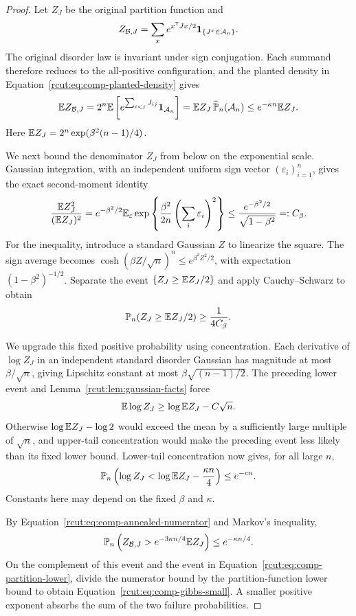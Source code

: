 \begin{proof}
 Let $Z_J$ be the original partition function and
 \[
  Z_{\mathcal B,J}=\sum_x e^{x^{\mathsf T}Jx/2}\mathbf 1_{\{J^x\in\mathcal A_n\}}.
 \]
 The original disorder law is invariant under sign conjugation.  Each
 summand therefore reduces to the all-positive configuration, and the
 planted density in Equation~\eqref{rcut:eq:comp-planted-density} gives
 \begin{equation}
  \mathbb E Z_{\mathcal B,J}
    =2^n\mathbb E\left[e^{\sum_{i<j}J_{ij}}\mathbf 1_{\mathcal A_n}\right]
    =\mathbb E Z_J\,\widehat{\mathbb P}_n(\mathcal A_n)
    \le e^{-\kappa n}\mathbb E Z_J.
  \label{rcut:eq:comp-annealed-numerator}
 \end{equation}
 Here $\mathbb E Z_J=2^n\exp(\beta^2(n-1)/4)$.

 We next bound the denominator $Z_J$ from below on the exponential
 scale.  Gaussian integration, with an independent uniform sign vector
 $(\varepsilon_i)_{i=1}^n$, gives the exact second-moment identity
 \begin{equation}
  \frac{\mathbb E Z_J^2}{(\mathbb E Z_J)^2}
    =e^{-\beta^2/2}\mathbb E_{\varepsilon}
       \exp\left\{\frac{\beta^2}{2n}
                    \left(\sum_i\varepsilon_i\right)^2\right\}
    \le\frac{e^{-\beta^2/2}}{\sqrt{1-\beta^2}}=:C_\beta.
  \label{rcut:eq:comp-partition-second-moment}
 \end{equation}
 For the inequality, introduce a standard Gaussian $Z$ to linearize
 the square.  The sign average becomes
 $\cosh(\beta Z/\sqrt n)^n\le e^{\beta^2Z^2/2}$, with expectation
 $(1-\beta^2)^{-1/2}$.  Separate the event
 $\{Z_J\ge\mathbb E Z_J/2\}$ and apply Cauchy--Schwarz to obtain
 \[
  \mathbb P_n(Z_J\ge\mathbb E Z_J/2)\ge\frac1{4C_\beta}.
 \]

 We upgrade this fixed positive probability using concentration.
 Each derivative of $\log Z_J$ in an independent standard disorder
 Gaussian has magnitude at most $\beta/\sqrt n$, giving Lipschitz
 constant at most $\beta\sqrt{(n-1)/2}$.  The preceding lower event
 and Lemma~\ref{rcut:lem:gaussian-facts} force
 \[
  \mathbb E\log Z_J\ge\log\mathbb E Z_J-C\sqrt n.
 \]
 Otherwise $\log\mathbb E Z_J-\log2$ would exceed the mean by a sufficiently
 large multiple of $\sqrt n$, and upper-tail concentration would make
 the preceding event less likely than its fixed lower bound.
 Lower-tail concentration now gives, for all large $n$,
 \begin{equation}
  \mathbb P_n\left(\log Z_J<\log\mathbb E Z_J-\frac{\kappa n}4\right)
      \le e^{-c n}.
  \label{rcut:eq:comp-partition-lower}
 \end{equation}
 Constants here may depend on the fixed $\beta$ and $\kappa$.

 By Equation~\eqref{rcut:eq:comp-annealed-numerator} and Markov's
 inequality,
 \[
  \mathbb P_n\left(Z_{\mathcal B,J}>
          e^{-3\kappa n/4}\mathbb E Z_J\right)\le e^{-\kappa n/4}.
 \]
 On the complement of this event and the event in
 Equation~\eqref{rcut:eq:comp-partition-lower}, divide the numerator
 bound by the partition-function lower bound to obtain
 Equation~\eqref{rcut:eq:comp-gibbs-small}.  A smaller positive exponent
 absorbs the sum of the two failure probabilities.
\end{proof}
